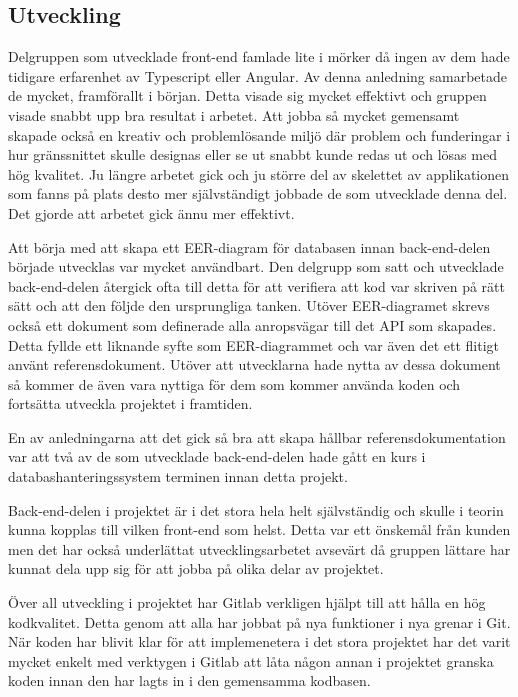 \subsection{Utveckling}
Delgruppen som utvecklade front-end famlade lite i mörker då ingen av dem hade tidigare erfarenhet av Typescript eller Angular. Av denna anledning samarbetade de mycket, framförallt i början. Detta visade sig mycket effektivt och gruppen visade snabbt upp bra resultat i arbetet. Att jobba så mycket gemensamt skapade också en kreativ och problemlösande miljö där problem och funderingar i hur gränssnittet skulle designas eller se ut snabbt kunde redas ut och lösas med hög kvalitet. Ju längre arbetet gick och ju större del av skelettet av applikationen som fanns på plats desto mer självständigt jobbade de som utvecklade denna del. Det gjorde att arbetet gick ännu mer effektivt.

Att börja med att skapa ett EER-diagram för databasen innan back-end-delen började utvecklas var mycket användbart. Den delgrupp som satt och utvecklade back-end-delen återgick ofta till detta för att verifiera att kod var skriven på rätt sätt och att den följde den ursprungliga tanken. Utöver EER-diagramet skrevs också ett dokument som definerade alla anropsvägar till det API som skapades. Detta fyllde ett liknande syfte som EER-diagrammet och var även det ett flitigt använt referensdokument. Utöver att utvecklarna hade nytta av dessa dokument så kommer de även vara nyttiga för dem som kommer använda koden och fortsätta utveckla projektet i framtiden.

En av anledningarna att det gick så bra att skapa hållbar referensdokumentation var att två av de som utvecklade back-end-delen hade gått en kurs i databashanteringssystem terminen innan detta projekt.

Back-end-delen i projektet är i det stora hela helt självständig och skulle i teorin kunna kopplas till vilken front-end som helst. Detta var ett önskemål från kunden men det har också underlättat utvecklingsarbetet avsevärt då gruppen lättare har kunnat dela upp sig för att jobba på olika delar av projektet.

Över all utveckling i projektet har Gitlab verkligen hjälpt till att hålla en hög kodkvalitet. Detta genom att alla har jobbat på nya funktioner i nya grenar i Git. När koden har blivit klar för att implemenetera i det stora projektet har det varit mycket enkelt med verktygen i Gitlab att låta någon annan i projektet granska koden innan den har lagts in i den gemensamma kodbasen.


